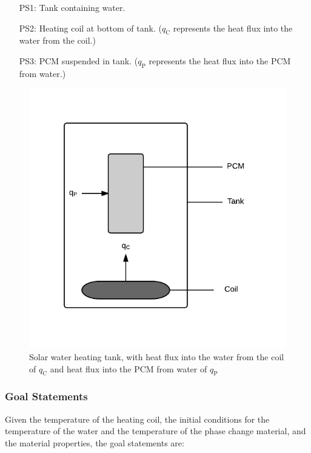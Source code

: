 \documentclass[12pt]{article}
\begin{document}
\begin{itemize}
\item[PS1:]{Tank containing water.}
\item[PS2:]{Heating coil at bottom of tank. (${q_{\text{C}}}$ represents the heat flux into the water from the coil.)}
\item[PS3:]{PCM suspended in tank. (${q_{\text{P}}}$ represents the heat flux into the PCM from water.)}
\end{itemize}
\begin{figure}
\begin{center}
\includegraphics[width=\textwidth]{../../../../datafiles/swhs/Tank.png}
\caption{Solar water heating tank, with heat flux into the water from the coil of ${q_{\text{C}}}$ and heat flux into the PCM from water of ${q_{\text{P}}}$}
\label{Figure:Tank}
\end{center}
\end{figure}
\subsubsection{Goal Statements}
\label{Sec:GoalStmt}
Given the temperature of the heating coil, the initial conditions for the temperature of the water and the temperature of the phase change material, and the material properties, the goal statements are:
\end{document}
